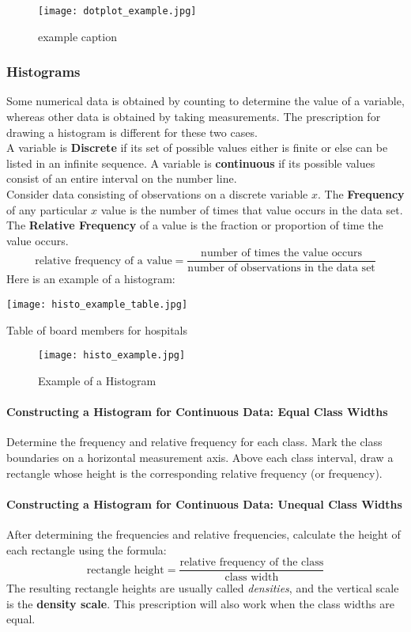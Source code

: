 \documentclass{article}
\newcommand{\p}[1]{\paragraph{#1}} %
\begin{document}
		\begin{figure}[!htb]
		   \centering
		   \texttt{[image: dotplot\_example.jpg]} 
		   \caption{example caption}
		   \label{fig:example}
		\end{figure}
		
		\subsubsection{Histograms} 
		Some numerical data is obtained by counting to determine the value of a variable, 
		whereas other data is obtained by taking measurements. The prescription for drawing a 
		histogram is different for these two cases. \\
	
		A variable is \textbf{Discrete} if its set of possible values either is finite or else can be listed 
		in an infinite sequence. A variable is \textbf{continuous} if its possible values consist of an 
		entire interval on the number line. \\
		Consider data consisting of observations on a discrete variable $x$. The 
		\textbf{Frequency} of any particular $x$ value is the number of times that value occurs in 
		the data set. The \textbf{Relative Frequency} of a value is the fraction or proportion of time 
		the value occurs.
		\[ \text{relative frequency of a value} = \frac{\text{number of times the value occurs}}
		{\text{number of observations in the data set}} \]
		Here is an example of a histogram:
	
		\begin{table}[!htb]
		   \centering
		   \texttt{[image: histo\_example\_table.jpg]} 
		   \caption{Table of board members for hospitals}
		   \label{tab:histo_table}
		\end{table}
	
		\begin{figure}[!htb]
		   \centering
		   \texttt{[image: histo\_example.jpg]} 
		   \caption{Example of a Histogram}
		   \label{fig:histo_example}
		\end{figure}
	
	\p{Constructing a Histogram for Continuous Data: Equal Class Widths}
	Determine the frequency and relative frequency for each class. Mark the class boundaries 
	on a horizontal measurement axis. Above each class interval, draw a rectangle whose 
	height is the corresponding relative frequency (or frequency).
	
	\p{Constructing a Histogram for Continuous Data: Unequal Class Widths}
	After determining the frequencies and relative frequencies, calculate the height of each 
	rectangle using the formula:
	\[ \text{rectangle height} = \frac{\text{relative frequency of the class}}{\text{class width}} \]
	The resulting rectangle heights are usually called \emph{densities}, and the vertical scale 
	is the \textbf{density scale}. This prescription will also work when the class widths are 
	equal.
	
\end{document}

